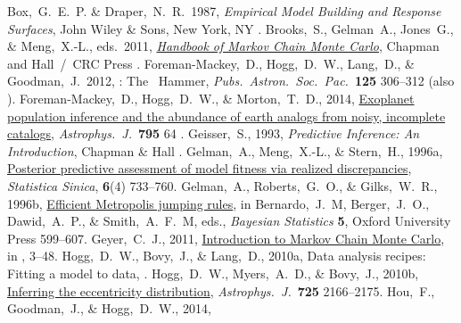 \documentclass[12pt,twoside,pdftex]{article}
\newcommand{\MCMC}{\acronym{MCMC}}
\begin{document}
\clearpage
\raggedright
\begin{thebibliography}{}
  Box,~G.~E.~P. \& Draper,~N.~R.\ 1987,
  \textit{Empirical Model Building and Response Surfaces},
  John Wiley \& Sons, New York, NY
  .
  Brooks,~S., Gelman~A., Jones~G., \& Meng,~X.-L., eds.\ 2011,
  \href{http://www.mcmchandbook.net/HandbookTableofContents.html}{\textit{Handbook of Markov Chain Monte Carlo}},
  Chapman and Hall~/~CRC Press
  .
  Foreman-Mackey,~D., Hogg,~D.~W., Lang,~D., \& Goodman,~J.\ 2012,
  : The \MCMC\ Hammer,
  \textit{Pubs.\ Astron.\ Soc.\ Pac.}\ \textbf{125} 306--312
  (also ).
  Foreman-Mackey,~D., Hogg,~D.~W., \& Morton,~T.~D., 2014,
  \href{http://adsabs.harvard.edu/abs/2014ApJ...795...64F}{Exoplanet population
    inference and the abundance of earth analogs from noisy, incomplete catalogs},
  \textit{Astrophys.\ J.}\ \textbf{795} 64
  .
  Geisser,~S., 1993,
  \textit{Predictive Inference: An Introduction},
  Chapman \& Hall
  .
  Gelman,~A., Meng,~X.-L., \& Stern,~H., 1996a,
  \href{http://www.jstor.org/stable/24306036}{Posterior predictive assessment of model fitness via realized discrepancies},
  \textit{Statistica Sinica}, \textbf{6}(4) 733--760.
  Gelman,~A., Roberts,~G.~O., \& Gilks,~W.~R., 1996b,
  \href{http://www.stat.columbia.edu/~gelman/research/published/baystat5.pdf}{Efficient Metropolis jumping rules},
  in Bernardo,~J.~M, Berger,~J.~O., Dawid,~A.~P., \& Smith,~A.~F.~M, eds.,
  \textit{Bayesian Statistics} \textbf{5}, Oxford University Press
  599--607.
  Geyer,~C.~J., 2011,
  \href{http://www.mcmchandbook.net/HandbookChapter1.pdf}{Introduction to Markov Chain Monte Carlo},
  in \citet{mcmchandbook}, 3--48.
  Hogg,~D.~W., Bovy,~J., \& Lang,~D., 2010a,
  Data analysis recipes: Fitting a model to data,
  .
  Hogg,~D.~W., Myers,~A.~D., \& Bovy,~J., 2010b,
  \href{http://adsabs.harvard.edu/abs/2010ApJ...725.2166H}{Inferring the eccentricity distribution},
  \textit{Astrophys.\ J.}\ \textbf{725} 2166--2175.
  Hou,~F., Goodman,~J., \& Hogg,~D.~W., 2014,

\end{thebibliography}
\end{document}
